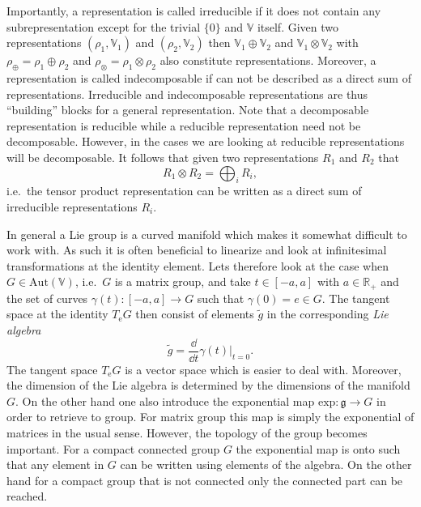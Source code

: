 Importantly, a representation is called irreducible if it does not contain any subrepresentation except for the trivial $\{0\}$ and $\mathbb{V}$ itself. Given two representations $(\rho_1,\mathbb{V}_1)$ and $(\rho_2,\mathbb{V}_2)$ then $\mathbb{V}_1\oplus\mathbb{V}_2$ and $\mathbb{V}_1\otimes\mathbb{V}_2$ with $\rho_\oplus = \rho_1\oplus\rho_2$ and $\rho_\otimes = \rho_1\otimes\rho_2$ also constitute representations. Moreover, a representation is called indecomposable if can not be described as a direct sum of representations. Irreducible and indecomposable representations are thus ``building'' blocks for a general representation. Note that a decomposable representation is reducible while a reducible representation need not be decomposable. However, in the cases we are looking at reducible representations will be decomposable. It follows that given two representations $R_1$ and $R_2$ that 
\begin{equation}
    R_1\otimes R_2 = \bigoplus_i R_i,
\end{equation}
i.e.\ the tensor product representation can be written as a direct sum of irreducible representations $R_i$.


In general a Lie group is a curved manifold which makes it somewhat difficult to work with. As such it is often beneficial to linearize and look at infinitesimal transformations at the identity element. Lets therefore look at the case when $G\in \text{Aut}(\mathbb{V})$, i.e.\ $G$ is a matrix group, and take $t\in [-a,a]$ with $a\in\mathbb{R_+}$ and the set of curves $\gamma(t): [-a,a]\to G$ such that $\gamma(0)= e\in G$. The tangent space at the identity $T_\mathrm{e}G$ then consist of elements $\tilde{g}$ in the corresponding \emph{Lie algebra}
\begin{equation}
\tilde{g} = \frac{\dd}{\dd t}\gamma(t)|_{t=0}.
\end{equation}
The tangent space $T_\mathrm{e}G$ is a vector space which is easier to deal with. Moreover, the dimension of the Lie algebra is determined by the dimensions of the manifold $G$. On the other hand one also introduce the exponential map $\text{exp}: \mathfrak{g}\to G$ in order to retrieve to group. For matrix group this map is simply the exponential of matrices in the usual sense. However, the topology of the group becomes important. For a compact connected group $G$ the exponential map is onto such that any element in $G$ can be written using elements of the algebra. On the other hand for a compact group that is not connected only the connected part can be reached. 


